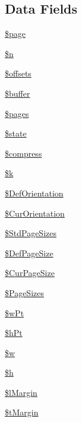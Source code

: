 \subsection*{Data Fields}
\begin{DoxyCompactItemize}
\item 
\hyperlink{class_f_p_d_f_a0a44e6760141442bb439b1ab1395d8ff}{\$page}
\item 
\hyperlink{class_f_p_d_f_aa5fae90470d460a65d5211ec08e6b05c}{\$n}
\item 
\hyperlink{class_f_p_d_f_a1c0c5798153818c42bcccf58deb642f0}{\$offsets}
\item 
\hyperlink{class_f_p_d_f_af1862006a19e84e552f66189adc792ae}{\$buffer}
\item 
\hyperlink{class_f_p_d_f_a263621399c53f2952c2329ee13ad8e4e}{\$pages}
\item 
\hyperlink{class_f_p_d_f_ae82306c4f2d17d8dd5c7d8d916b33bed}{\$state}
\item 
\hyperlink{class_f_p_d_f_abf799de0d30288b91ee73769281dd69d}{\$compress}
\item 
\hyperlink{class_f_p_d_f_ad6726cfaa85d4b8299d2b0f034cbf178}{\$k}
\item 
\hyperlink{class_f_p_d_f_a7918c7480b45c7fd590a43ca125cdfe8}{\$\+Def\+Orientation}
\item 
\hyperlink{class_f_p_d_f_a3ee0a135fc6d6a4b2ac30e6afb7a15a7}{\$\+Cur\+Orientation}
\item 
\hyperlink{class_f_p_d_f_a2323ac5b6d548996a98dd29021aedee9}{\$\+Std\+Page\+Sizes}
\item 
\hyperlink{class_f_p_d_f_a403e759d1c3233b294315918203f6ed7}{\$\+Def\+Page\+Size}
\item 
\hyperlink{class_f_p_d_f_a4621d0ec8fbbfbc7803f239af5f9d563}{\$\+Cur\+Page\+Size}
\item 
\hyperlink{class_f_p_d_f_ae0087648cba6cee3a31973c9d782a021}{\$\+Page\+Sizes}
\item 
\hyperlink{class_f_p_d_f_a365671c417c367c8fead3a9f3001dbbf}{\$w\+Pt}
\item 
\hyperlink{class_f_p_d_f_acf45ad371382d8c87377d2f18ae318cc}{\$h\+Pt}
\item 
\hyperlink{class_f_p_d_f_ae51391055f5e898dc2625d155b016aaa}{\$w}
\item 
\hyperlink{class_f_p_d_f_ab00da9d5d8bd5b6b944793e093860aff}{\$h}
\item 
\hyperlink{class_f_p_d_f_ac77ad1dad48f2fb5f0bb64c8ac4e16f1}{\$l\+Margin}
\item 
\hyperlink{class_f_p_d_f_ada90bc768d4d9df4e243219cc4c2c2cb}{\$t\+Margin}

\end{DoxyCompactItemize}
